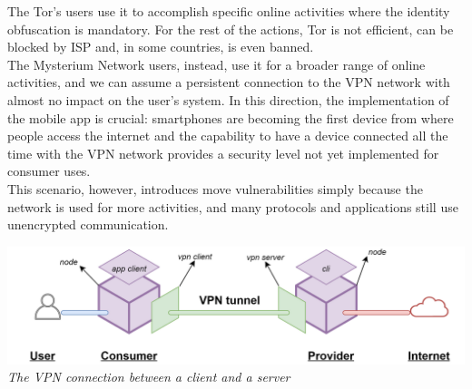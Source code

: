 \documentclass[12pt]{article}
\begin{document}
	The Tor's users use it to accomplish specific online activities where the identity obfuscation is mandatory. For the rest of the actions, Tor is not efficient, can be blocked by ISP and, in some countries, is even banned.\\
	The Mysterium Network users, instead, use it for a broader range of online activities, and we can assume a persistent connection to the VPN network with almost no impact on the user's system. In this direction, the implementation of the mobile app is crucial: smartphones are becoming the first device from where people access the internet and the capability to have a device connected all the time with the VPN network provides a security level not yet implemented for consumer uses.\\
	This scenario, however, introduces move vulnerabilities simply because the network is used for more activities, and many protocols and applications still use unencrypted communication.\\

	\bigbreak
	\begin{center}
		\includegraphics[width=1\linewidth]{images/client_server_vpn_connection2.png}
		\small{\textit{The VPN connection between a client and a server}}
	\end{center}
	\bigbreak
	
\end{document}
